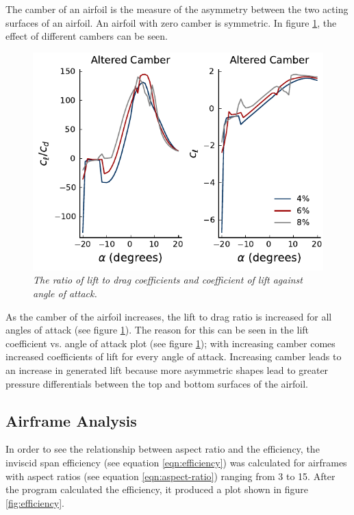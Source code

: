\documentclass[journal]{new-aiaa}
\begin{document}
	The camber of an airfoil is the measure of the asymmetry between the two acting surfaces of an airfoil. An airfoil with zero camber is symmetric. In figure \ref{fig:altered-camber}, the effect of different cambers can be seen.\\
	
	\begin{figure}[H]
		\centering
		\includegraphics{../graphics/altered-camber.pdf}
		\caption{\emph{The ratio of lift to drag coefficients and coefficient of lift against angle of attack.}}
		\label{fig:altered-camber}
	\end{figure}
	
	As the camber of the airfoil increases, the lift to drag ratio is increased for all angles of attack (see figure \ref{fig:altered-camber}). The reason for this can be seen in the lift coefficient vs. angle of attack plot (see figure \ref{fig:altered-camber}); with increasing camber comes increased coefficients of lift for every angle of attack. Increasing camber leads to an increase in generated lift because more asymmetric shapes lead to greater pressure differentials between the top and bottom surfaces of the airfoil.\\
	
	\subsection{Airframe Analysis}
	
	In order to see the relationship between aspect ratio and the efficiency, the inviscid span efficiency (see equation \ref{eqn:efficiency}) was calculated for airframes with aspect ratios (see equation \ref{eqn:aspect-ratio}) ranging from 3 to 15. After the program calculated the efficiency, it produced a plot shown in figure \ref{fig:efficiency}.\\
	
\end{document}
